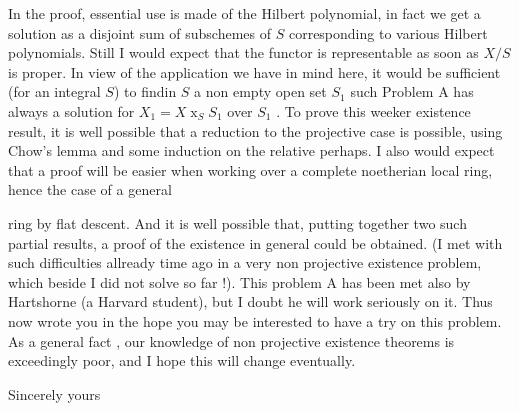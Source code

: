 In the proof, essential use is made of the Hilbert polynomial, in fact we get a solution as a disjoint sum of subschemes of $S$ corresponding to various Hilbert polynomials. Still I would expect that the  functor is representable as soon as $X/S$ is proper. In view of the application we have in mind here, it would be sufficient (for an integral $S$) to findin $S$ a non empty  open set $S_1$ such Problem A has always a solution for $X_1=X\mathbin{x}_S S_1$ over $S_1$ . To prove this weeker existence result, it is well possible that a reduction to the projective case is possible, using Chow's lemma and some induction on the relative  perhaps. I also would expect that a proof will be easier when working over a complete noetherian local ring, hence the case of a general \begin{minipage}[c]{3.9cm}
\end{minipage} ring by flat descent. And it is well possible that, putting together two such partial results, a proof of the existence in general could be obtained. (I met with such difficulties allready time ago in a very  non projective existence problem, which beside I did not solve so far !). This problem A has been met also by Hartshorne (a Harvard student), but I doubt he will work seriously on it. Thus  now wrote you in the hope you may be interested to have a try on this problem. As a general fact , our knowledge of non projective existence theorems is exceedingly poor, and I hope this will change eventually.

\noindent\hspace*{1.5em}Sincerely yours\hfill{}\par
